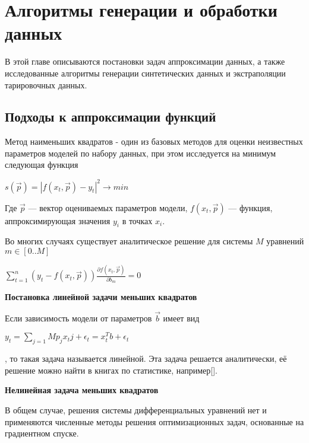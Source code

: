 \chapter{Алгоритмы генерации и обработки данных} \label{chapt2}

В этой главе описываются постановки задач аппроксимации данных, а также исследованные алгоритмы генерации 
синтетических данных и
экстраполяции тарировочных данных. 


\section{Подходы к аппроксимации функций}\label{sect2_1}
Метод наименьших квадратов - один из базовых методов для оценки неизвестных 
параметров моделей по набору данных, при этом исследуется на минимум 
следующая функция


\begin{center}
 $ s(\vec{p}) = \left| f(x_t, \vec{p}) - y_t \right| ^ 2 \rightarrow min $
\end{center}


Где $\vec{p}$ --- вектор оцениваемых параметров модели, $f(x_t, \vec{p}) $
--- функция, аппроксимирующая значения $y_i$ в точках $x_i$.

Во многих случаях существует аналитическое решение для системы $M$ уравнений 
$m \in [0..M]$
\begin{center}
 $ \displaystyle\sum_{t = 1}^n \left( y_t - f(x_t,\vec{p})\right) 
 \frac{\partial f(x_t, \vec{p})}{\partial b_m} = 0 $
\end{center}

\textbf{Постановка линейной задачи меньших квадратов}

Если зависимость модели от параметров $\vec{b}$ имеет вид 

\begin{center}
$ y_t = \displaystyle\sum_{j=1}{M}p_j x_tj + \epsilon_t = 
x^T_tb + \epsilon_t$ 
\end{center}
, то такая задача называется линейной. Эта задача решается аналитически, 
её решение можно найти в книгах по статистике, например[].



\textbf{Нелинейная задача меньших квадратов}


В общем случае, решения системы дифференциальных уравнений нет и 
применяются численные методы решения оптимизационных задач, 
основанные на градиентном спуске.

